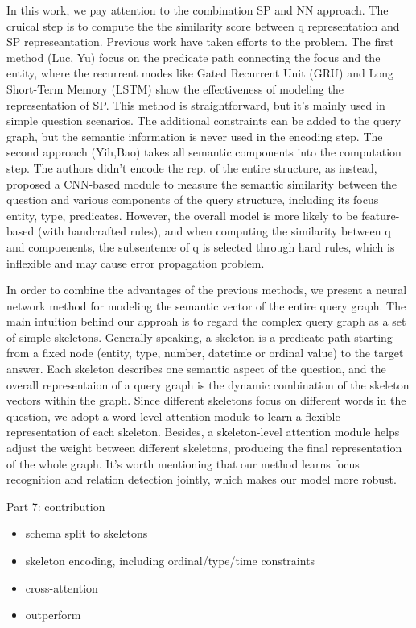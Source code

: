 In this work, we pay attention to the combination SP and NN approach.
The cruical step is to compute the the similarity score between q representation and SP represeantation.
Previous work have taken efforts to the problem.
The first method (Luc, Yu) focus on the predicate path connecting the focus and the entity, 
where the recurrent modes like Gated Recurrent Unit (GRU) and Long Short-Term Memory (LSTM)
show the effectiveness of modeling the representation of SP.
This method is straightforward, but it's mainly used in simple question scenarios.
The additional constraints can be added to the query graph, but the semantic information
is never used in the encoding step.
The second approach (Yih,Bao) takes all semantic components into the computation step.
The authors didn't encode the rep. of the entire structure, as instead,
proposed a CNN-based module to measure the semantic similarity between the question
and various components of the query structure, including its focus entity, type, predicates.
However, the overall model is more likely to be feature-based (with handcrafted rules),
and when computing the similarity between q and compoenents, the subsentence of q is
selected through hard rules, which is inflexible and may cause error propagation problem.


In order to combine the advantages of the previous methods,
we present a neural network method for modeling the semantic vector of the entire query graph.
The main intuition behind our approah is to regard the complex query graph
as a set of simple skeletons.
Generally speaking, a skeleton is a predicate path starting from a fixed node
(entity, type, number, datetime or ordinal value) to the target answer.
Each skeleton describes one semantic aspect of the question,
and the overall representaion of a query graph is the
dynamic combination of the skeleton vectors within the graph.
Since different skeletons focus on different words in the question,
we adopt a word-level attention module to learn a flexible representation
of each skeleton.
Besides, a skeleton-level attention module helps adjust the weight between different skeletons,
producing the final representation of the whole graph.
It's worth mentioning that our method learns focus recognition and relation detection jointly,
which makes our model more robust. 


Part 7: contribution
\begin{itemize}
\item schema split to skeletons
\item skeleton encoding, including ordinal/type/time constraints
\item cross-attention
\item outperform
\end{itemize}
